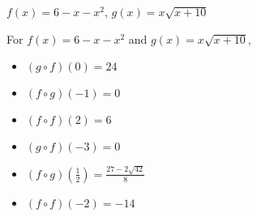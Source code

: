 {$f(x) = 6-x-x^2$, $g(x) = x\sqrt{x+10}$}
{For  $f(x) = 6-x-x^2$ and $g(x) = x\sqrt{x+10}$,
\begin{multicols}{2}

\begin{itemize}

\item  $(g\circ f)(0) = 24$

\item  $(f\circ g)(-1) = 0$

\item  $(f \circ f)(2) = 6$

\item  $(g\circ f)(-3) = 0$

\item  $(f\circ g)\left(\frac{1}{2}\right) = \frac{27-2\sqrt{42}}{8}$

\item  $(f \circ f)(-2) = -14$

\end{itemize}

\end{multicols}}